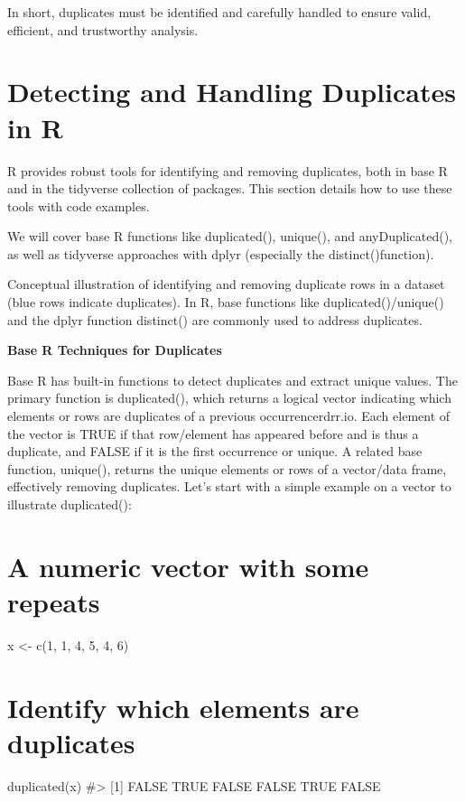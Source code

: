\documentclass[
  man,
  floatsintext,
  longtable,
  nolmodern,
  notxfonts,
  notimes,
  colorlinks=true,linkcolor=blue,citecolor=blue,urlcolor=blue]{apa7}
\begin{document}
In short, duplicates must be identified and carefully handled to ensure
valid, efficient, and trustworthy analysis.

\section{Detecting and Handling Duplicates in
R}\label{detecting-and-handling-duplicates-in-r}

R provides robust tools for identifying and removing duplicates, both in
base R and in the tidyverse collection of packages. This section details
how to use these tools with code examples.

We will cover base R functions like duplicated(), unique(), and
anyDuplicated(), as well as tidyverse approaches with dplyr (especially
the distinct()function).

Conceptual illustration of identifying and removing duplicate rows in a
dataset (blue rows indicate duplicates). In R, base functions like
duplicated()/unique() and the dplyr function distinct() are commonly
used to address duplicates.

\textbf{Base R Techniques for Duplicates}

Base R has built-in functions to detect duplicates and extract unique
values. The primary function is duplicated(), which returns a logical
vector indicating which elements or rows are duplicates of a previous
occurrencerdrr.io. Each element of the vector is TRUE if that
row/element has appeared before and is thus a duplicate, and FALSE if it
is the first occurrence or unique. A related base function, unique(),
returns the unique elements or rows of a vector/data frame, effectively
removing duplicates. Let's start with a simple example on a vector to
illustrate duplicated():

\section{A numeric vector with some
repeats}\label{a-numeric-vector-with-some-repeats}

x \textless- c(1, 1, 4, 5, 4, 6)

\section{Identify which elements are
duplicates}\label{identify-which-elements-are-duplicates}

duplicated(x) \#\textgreater{} {[}1{]} FALSE TRUE FALSE FALSE TRUE FALSE
\end{document}
